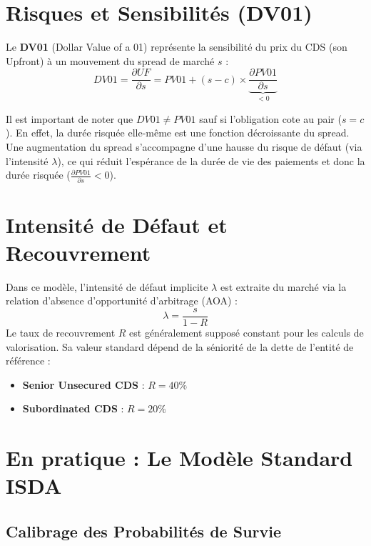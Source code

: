 \section{Risques et Sensibilités (DV01)}

Le \textbf{DV01} (Dollar Value of a 01) représente la sensibilité du prix du CDS (son Upfront) à un mouvement du spread de marché $s$ :
\begin{equation}
    DV01 = \frac{\partial UF}{\partial s} = PV01 + (s - c) \times \underbrace{\frac{\partial PV01}{\partial s}}_{< 0}
\end{equation}

\begin{remarque}
Il est important de noter que \textbf{$DV01 \neq PV01$} sauf si l'obligation cote au pair ($s = c$). En effet, la durée risquée elle-même est une fonction décroissante du spread. Une augmentation du spread s'accompagne d'une hausse du risque de défaut (via l'intensité $\lambda$), ce qui réduit l'espérance de la durée de vie des paiements et donc la durée risquée ($\frac{\partial PV01}{\partial s} < 0$).
\end{remarque}

\section{Intensité de Défaut et Recouvrement}

Dans ce modèle, l'intensité de défaut implicite $\lambda$ est extraite du marché via la relation d'absence d'opportunité d'arbitrage (AOA) :
\begin{equation}
    \lambda = \frac{s}{1 - R}
\end{equation}
Le taux de recouvrement $R$ est généralement supposé constant pour les calculs de valorisation. Sa valeur standard dépend de la séniorité de la dette de l'entité de référence :
\begin{itemize}
    \item \textbf{Senior Unsecured CDS} : $R = 40\%$
    \item \textbf{Subordinated CDS} : $R = 20\%$
\end{itemize}

\section{En pratique : Le Modèle Standard ISDA}

\subsection{Calibrage des Probabilités de Survie}

